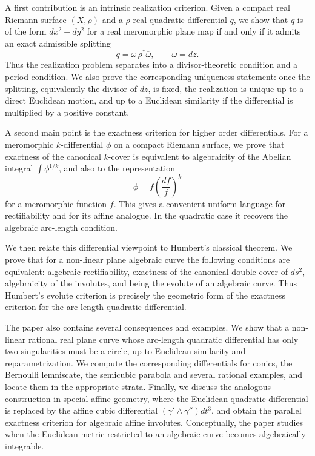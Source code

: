 \documentclass[reqno]{amsart}
\theoremstyle{definition}
\theoremstyle{remark}
\theoremstyle{definition}
\theoremstyle{definition}
\theoremstyle{definition}
\begin{document}
A first contribution is an intrinsic realization criterion.  Given a compact
real Riemann surface $(X,\rho)$ and a $\rho$-real quadratic differential
$q$, we show that $q$ is of the form $dx^2+dy^2$ for a real meromorphic
plane map if and only if it admits an exact admissible splitting
\[
        q=\omega\,\rho^*\overline{\omega},
        \qquad  \omega=dz .
\]
Thus the realization problem separates into a divisor-theoretic condition
and a period condition.  We also prove the corresponding uniqueness
statement: once the splitting, equivalently the divisor of $dz$, is fixed,
the realization is unique up to a direct Euclidean motion, and up to a
Euclidean similarity if the differential is multiplied by a positive
constant.

A second main point is the exactness criterion for higher order
differentials.  For a meromorphic $k$-differential $\phi$ on a compact
Riemann surface, we prove that exactness of the canonical $k$-cover is
equivalent to algebraicity of the Abelian integral $\int\phi^{1/k}$, and
also to the representation
\[
        \phi=f\left(\frac{df}{f}\right)^k
\]
for a meromorphic function $f$.  This gives a convenient uniform language
for rectifiability and for its affine analogue.  In the quadratic case it
recovers the algebraic arc-length condition.

We then relate this differential viewpoint to Humbert's classical theorem.
We prove that for a non-linear plane algebraic curve the following
conditions are equivalent: algebraic rectifiability, exactness of the
canonical double cover of $ds^2$, algebraicity of the involutes, and being
the evolute of an algebraic curve.  Thus Humbert's evolute criterion is
precisely the geometric form of the exactness criterion for the arc-length
quadratic differential.

The paper also contains several consequences and examples.  We show that a
non-linear rational real plane curve whose arc-length quadratic differential
has only two singularities must be a circle, up to Euclidean similarity and
reparametrization.  We compute the corresponding differentials for conics,
the Bernoulli lemniscate, the semicubic parabola and several rational
examples, and locate them in the appropriate strata.  Finally, we discuss
the analogous construction in special affine geometry, where the Euclidean
quadratic differential is replaced by the affine cubic differential
$(\gamma'\wedge\gamma'')dt^3$, and obtain the parallel exactness criterion
for algebraic affine involutes.  Conceptually, the paper studies when the Euclidean metric restricted to an algebraic curve becomes algebraically integrable.
\end{document}
